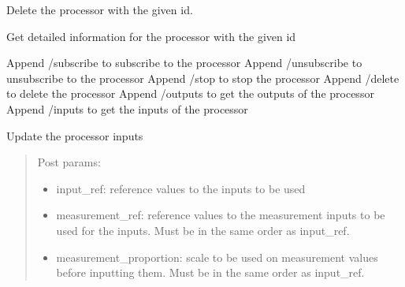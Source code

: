 \documentclass[letterpaper,10pt,english]{sphinxmanual}
\begin{document}

\begin{fulllineitems}
\label{\detokenize{src.processors:src.processors.views.processor_delete}}
Delete the processor with the given id.

\end{fulllineitems}


\begin{fulllineitems}
\label{\detokenize{src.processors:src.processors.views.processor_detail}}
Get detailed information for the processor with the given id

Append /subscribe to subscribe to the processor
Append /unsubscribe to unsubscribe to the processor
Append /stop to stop the processor
Append /delete to delete the processor
Append /outputs to get the outputs of the processor
Append /inputs to get the inputs of the processor

\end{fulllineitems}


\begin{fulllineitems}
\label{\detokenize{src.processors:src.processors.views.processor_inputs_update}}
Update the processor inputs
\begin{quote}

Post params:
\begin{itemize}
\item {} 
input\_ref: reference values to the inputs to be used

\item {} 
measurement\_ref: reference values to the measurement inputs to be used for the inputs.
Must be in the same order as input\_ref.

\item {} 
measurement\_proportion: scale to be used on measurement values before inputting them.
Must be in the same order as input\_ref.

\end{itemize}
\end{quote}

\end{fulllineitems}
\end{document}
